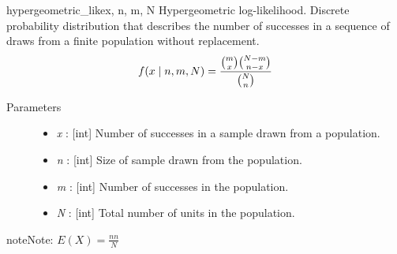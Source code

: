 \hypertarget{pymc.distributions.hypergeometric_like}{}\begin{funcdesc}{hypergeometric\_like}{x, n, m, N}
Hypergeometric log-likelihood. Discrete probability distribution that
describes the number of successes in a sequence of draws from a finite
population without replacement.
\begin{gather}
\begin{split}f(x \mid n, m, N) = \frac{\binom{m}{x}\binom{N-m}{n-x}}{\binom{N}{n}}\end{split}\notag
\end{gather}\begin{description}
\item[Parameters] \leavevmode\begin{itemize}
\item {} 
\emph{x} : {[}int{]} Number of successes in a sample drawn from a population.

\item {} 
\emph{n} : {[}int{]} Size of sample drawn from the population.

\item {} 
\emph{m} : {[}int{]} Number of successes in the population.

\item {} 
\emph{N} : {[}int{]} Total number of units in the population.

\end{itemize}

\end{description}

\begin{notice}{note}{Note:}
$E(X) = \frac{n n}{N}$
\end{notice}
\end{funcdesc}


